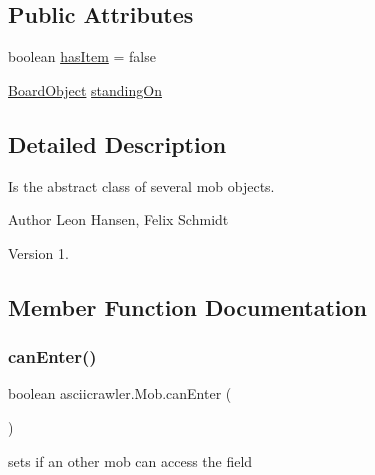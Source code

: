 \subsection*{Public Attributes}
\begin{DoxyCompactItemize}
\item 
boolean \hyperlink{classasciicrawler_1_1Mob_af8410e28e76e9507a9c96c7012ff3c91}{has\+Item} = false
\item 
\hyperlink{classasciicrawler_1_1BoardObject}{Board\+Object} \hyperlink{classasciicrawler_1_1Mob_a5682718b4d9809cfcc1010629f1ee0c7}{standing\+On}
\end{DoxyCompactItemize}


\subsection{Detailed Description}
Is the abstract class of several mob objects. 

\begin{DoxyAuthor}{Author}
Leon Hansen, Felix Schmidt 
\end{DoxyAuthor}
\begin{DoxyVersion}{Version}
1. 
\end{DoxyVersion}


\subsection{Member Function Documentation}
\mbox{\label{classasciicrawler_1_1Mob_ad9f62c59a65cb1e8ab2f54d5a8e2fbe3}} 
\subsubsection{\texorpdfstring{can\+Enter()}{canEnter()}}
{\footnotesize\ttfamily boolean asciicrawler.\+Mob.\+can\+Enter (\begin{DoxyParamCaption}{ }\end{DoxyParamCaption})\hspace{0.3cm}{\ttfamily [inline]}}

sets if an other mob can access the field \mbox{\label{classasciicrawler_1_1Mob_aee5629a34d8789bbec9918326fdd9612}} 
